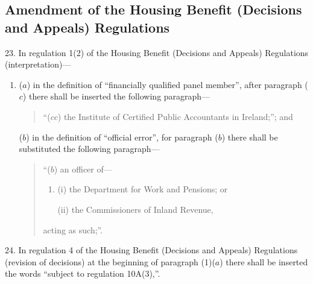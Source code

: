 \documentclass[12pt,a4paper]{article}
\begin{document}
%


\subsection[23--28. Amendment of the Housing Benefit (Decisions and Appeals) Regulations]{Amendment of the Housing Benefit (Decisions and Appeals) Regulations}

23.  In regulation 1(2) of the Housing Benefit (Decisions and Appeals) Regulations (interpretation)—
\begin{enumerate}\item[]
($a$) in the definition of “financially qualified panel member”, after paragraph ($c$)  there shall be inserted the following paragraph—
\begin{quotation}
“($cc$) the Institute of Certified Public Accountants in Ireland;”; and
\end{quotation}

($b$) in the definition of “official error”, for paragraph ($b$)  there shall be substituted the following paragraph—
\begin{quotation}
“($b$) an officer of—
\begin{enumerate}\item[]
(i) the Department for Work and Pensions; or

(ii) the Commissioners of Inland Revenue,
\end{enumerate}
acting as such;”.
\end{quotation}
\end{enumerate}

\medskip

24.  In regulation 4 of the Housing Benefit (Decisions and Appeals) Regulations (revision of decisions) at the beginning of paragraph (1)($a$)  there shall be inserted the words “subject to regulation 10A(3),”.

\medskip
\end{document}
